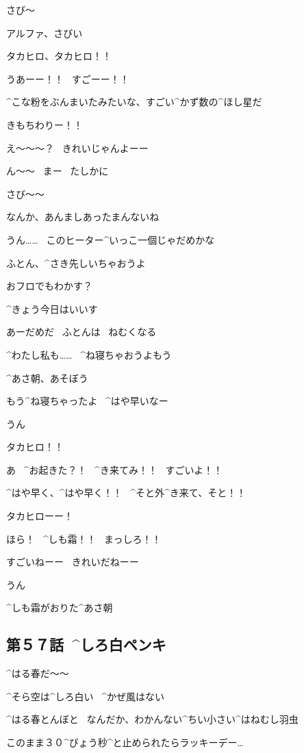 \page
\A さび〜

\T アルファ、さびい

\A タカヒロ、タカヒロ！！

\page[15]
\A うあーー！！
\ すごーー！！

\T ^{こな}{粉}をぶんまいたみたいな、すごい^{かず}{数}の^{ほし}{星}だ

\T きもちわりー！！

\A え〜〜〜？
\ きれいじゃんよーー

\T ん〜〜
\ まー
\ たしかに

\T さび〜〜

\page
\T なんか、あんましあったまんないね

\A うん……
\ このヒーター^{いっこ}{一個}じゃだめかな

\A ふとん、^{さき}{先}しいちゃおうよ

\A おフロでもわかす？

\T ^{きょう}{今日}はいいす

\page
\T あーだめだ
\ ふとんは
\ ねむくなる

\A ^{わたし}{私}も……
\ ^{ね}{寝}ちゃおうよもう

\A ^{あさ}{朝}、あそぼう

\page
\T もう^{ね}{寝}ちゃったよ
\ ^{はや}{早}いなー

\page
\A うん

\page
\A タカヒロ！！

\page
\A あ
\ ^{お}{起}きた？！
\ ^{き}{来}てみ！！
\ すごいよ！！

\A ^{はや}{早}く、^{はや}{早}く！！
\ ^{そと}{外}^{き}{来}て、そと！！

\A タカヒローー！

\page
\A ほら！
\ ^{しも}{霜}！！
\ まっしろ！！

\page
\A すごいねーー
\ きれいだねーー

\page
\T うん

\T ^{しも}{霜}がおりた^{あさ}{朝}


\subsection{第５７話\ ^{しろ}{白}ペンキ}

\page[27]
\A ^{はる}{春}だ〜〜

\A ^{そら}{空}は^{しろ}{白}い
\ ^{かぜ}{風}はない

\A ^{はる}{春}とんぼと
\ なんだか、わかんない^{ちい}{小}さい^{はねむし}{羽虫}

\page
\A このまま３０^{びょう}{秒}^{と}{止}められたらラッキーデー…

